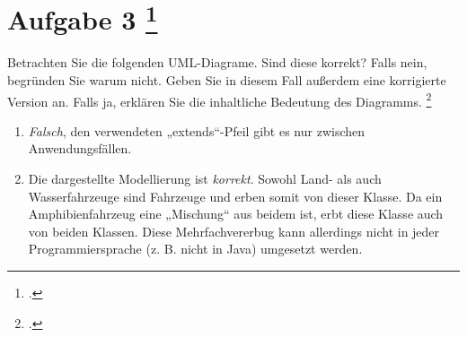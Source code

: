 \documentclass{lehramt-informatik-aufgabe}
\begin{document}
\section{Aufgabe 3
\footcite[Thema 1 Teilaufgabe 1 Aufgabe 3]{examen:46116:2017:03}}

Betrachten Sie die folgenden UML-Diagrame. Sind diese korrekt? Falls
nein, begründen Sie warum nicht. Geben Sie in diesem Fall außerdem eine
korrigierte Version an. Falls ja, erklären Sie die inhaltliche Bedeutung
des Diagramms.
\footcite[Aufgabe 2]{sosy:ab:3}

\begin{enumerate}
\item \strut


\begin{antwort}
\emph{Falsch}, den verwendeten „extends“-Pfeil gibt es nur zwischen
Anwendungsfällen.

\end{antwort}

\item \strut


\begin{antwort}
Die dargestellte Modellierung ist \emph{korrekt}. Sowohl Land- als auch
Wasserfahrzeuge sind Fahrzeuge und erben somit von dieser Klasse. Da
ein Amphibienfahrzeug eine „Mischung“ aus beidem ist, erbt diese Klasse
auch von beiden Klassen. Diese Mehrfachvererbug kann allerdings nicht
in jeder Programmiersprache (z. B. nicht in Java) umgesetzt
werden.
\end{antwort}


\end{enumerate}
\end{document}
